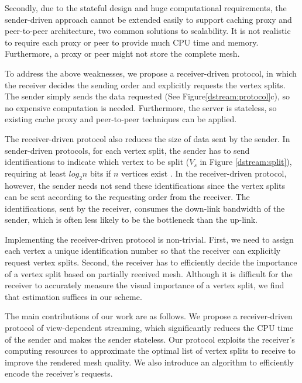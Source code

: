     Secondly, due to the stateful design and huge computational requirements,
    the sender-driven approach cannot be extended easily to support 
    caching proxy and peer-to-peer architecture, two common solutions to scalability. It is not realistic
    to require each proxy or peer to provide much CPU time and memory. 
    Furthermore, a proxy or peer might not store the complete mesh.

    To address the above weaknesses, we propose a receiver-driven protocol,
    in which the receiver decides the sending order and explicitly requests
    the vertex splits. The sender simply sends the data requested 
    (See Figure\ref{dstream:protocol}c), so no expensive computation is needed.
    Furthermore, the server is stateless, so
    existing cache proxy and peer-to-peer techniques can be applied.

    The receiver-driven protocol also reduces the size of data sent by the sender.
    In sender-driven protocols, for each vertex split, the sender has to send identifications
    to indicate which vertex to be split ($V_s$ in Figure \ref{dstream:split}),
    requiring at least $log_2{n}$ bits if $n$ vertices exist \cite{258843}. 
    In the receiver-driven protocol, however, the sender needs not send
    these identifications since the vertex splits can be sent according to
    the requesting order from the receiver. The identifications, sent
    by the receiver, consumes the down-link bandwidth 
    of the sender, which is often less likely to be the bottleneck than the up-link.

    Implementing the receiver-driven protocol is non-trivial. First, we need
    to assign each vertex a unique identification number so that the receiver
    can explicitly request vertex splits. Second, the receiver has to efficiently decide the
    importance of a vertex split based on partially received mesh.
    Although it is difficult for the receiver to accurately measure
    the visual importance of a vertex split, we find that estimation suffices
    in our scheme.  

    The main contributions of our work are as follows.  We
    propose a receiver-driven protocol of view-dependent streaming, which
    significantly reduces the CPU time of the sender
    and makes the sender stateless.  Our protocol exploits the receiver's 
    computing resources to approximate the optimal list of vertex splits to receive
    to improve the rendered mesh quality.  We also introduce an 
    algorithm to efficiently encode the receiver's requests.
    
